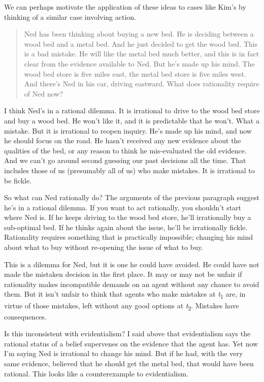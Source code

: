 \documentclass[
  11pt,
  letterpaper,
  DIV=11,
  numbers=noendperiod,
  twoside]{scrartcl}
\begin{document}
We can perhaps motivate the application of these ideas to cases like
Kim's by thinking of a similar case involving action.

\begin{quote}
Ned has been thinking about buying a new bed. He is deciding between a
wood bed and a metal bed. And he just decided to get the wood bed. This
is a bad mistake. He will like the metal bed much better, and this is in
fact clear from the evidence available to Ned. But he's made up his
mind. The wood bed store is five miles east, the metal bed store is five
miles west. And there's Ned in his car, driving eastward. What does
rationality require of Ned now?
\end{quote}

I think Ned's in a rational dilemma. It is irrational to drive to the
wood bed store and buy a wood bed. He won't like it, and it is
predictable that he won't. What a mistake. But it is irrational to
reopen inquiry. He's made up his mind, and now he should focus on the
road. He hasn't received any new evidence about the qualities of the
bed, or any reason to think he mis-evaluated the old evidence. And we
can't go around second guessing our past decisions all the time. That
includes those of us (presumably all of us) who make mistakes. It is
irrational to be fickle.

So what can Ned rationally do? The arguments of the previous paragraph
suggest he's in a rational dilemma. If you want to act rationally, you
shouldn't start where Ned is. If he keeps driving to the wood bed store,
he'll irrationally buy a sub-optimal bed. If he thinks again about the
issue, he'll be irrationally fickle. Rationality requires something that
is practically impossible; changing his mind about what to buy without
re-opening the issue of what to buy.

This is a dilemma for Ned, but it is one he could have avoided. He could
have not made the mistaken decision in the first place. It may or may
not be unfair if rationality makes incompatible demands on an agent
without any chance to avoid them. But it isn't unfair to think that
agents who make mistakes at \emph{t}\textsubscript{1} are, in virtue of
those mistakes, left without any good options at
\emph{t}\textsubscript{2}. Mistakes have consequences.

Is this inconsistent with evidentialism? I said above that evidentialism
says the rational status of a belief supervenes on the evidence that the
agent has. Yet now I'm saying Ned is irrational to change his mind. But
if he had, with the very same evidence, believed that he should get the
metal bed, that would have been rational. This looks like a
counterexample to evidentialism.
\end{document}

